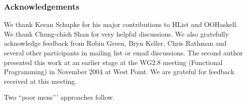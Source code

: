 \documentclass[nocopyrightspace,preprint]{sigplan-proc}
\newcommand{\mysize}{\small}
\begin{document}
\makeatactive















    




{\small 

\subsubsection*{Acknowledgements}
 
We thank Keean Schupke for his major contributions to HList and
OOHaskell. We thank Chung-chieh Shan for very helpful discussions.  We
also gratefully acknowledge feedback from Robin Green, Bryn Keller,
Chris Rathman and several other participants in mailing list or email
discussions. The second author presented this work at an earlier stage
at the WG2.8 meeting (Functional Programming) in November 2004 at West
Point. We are grateful for feedback received at this meeting.

}




{\small




}





\renewcommand{\mysize}{\footnotesize}

\appendix

\bigskip

{\large Two ``poor mens''' approaches follow.}


\end{document}
